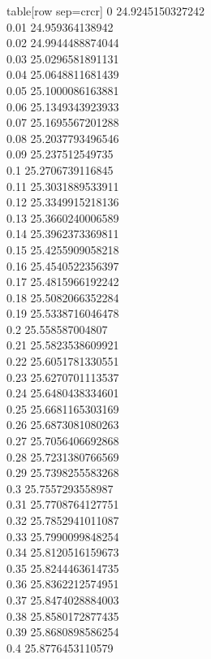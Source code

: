   table[row sep=crcr]{%
0	24.9245150327242\\
0.01	24.959364138942\\
0.02	24.9944488874044\\
0.03	25.0296581891131\\
0.04	25.0648811681439\\
0.05	25.1000086163881\\
0.06	25.1349343923933\\
0.07	25.1695567201288\\
0.08	25.2037793496546\\
0.09	25.237512549735\\
0.1	25.2706739116845\\
0.11	25.3031889533911\\
0.12	25.3349915218136\\
0.13	25.3660240006589\\
0.14	25.3962373369811\\
0.15	25.4255909058218\\
0.16	25.4540522356397\\
0.17	25.4815966192242\\
0.18	25.5082066352284\\
0.19	25.5338716046478\\
0.2	25.558587004807\\
0.21	25.5823538609921\\
0.22	25.6051781330551\\
0.23	25.6270701113537\\
0.24	25.6480438334601\\
0.25	25.6681165303169\\
0.26	25.6873081080263\\
0.27	25.7056406692868\\
0.28	25.7231380766569\\
0.29	25.7398255583268\\
0.3	25.7557293558987\\
0.31	25.7708764127751\\
0.32	25.7852941011087\\
0.33	25.7990099848254\\
0.34	25.8120516159673\\
0.35	25.8244463614735\\
0.36	25.8362212574951\\
0.37	25.8474028884003\\
0.38	25.8580172877435\\
0.39	25.8680898586254\\
0.4	25.8776453110579\\
}
